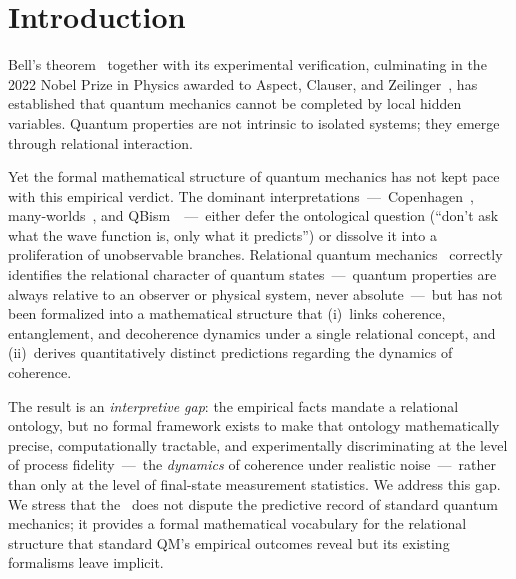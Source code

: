 
\section{Introduction}
\label{sec:intro}

Bell's theorem~\cite{Bell1964,CHSH1969} together with its experimental
verification, culminating in the 2022 Nobel Prize in Physics awarded to
Aspect, Clauser, and Zeilinger~\cite{Aspect1982,Zeilinger2022Nobel}, has
established that quantum mechanics cannot be completed by local hidden
variables.
Quantum properties are not intrinsic to isolated systems; they emerge through
relational interaction.

Yet the formal mathematical structure of quantum mechanics has not kept pace
with this empirical verdict.
The dominant interpretations~---~Copenhagen~\cite{Bohr1949},
many-worlds~\cite{Wallace2012}, and QBism~\cite{FMS2014}~---~either
defer the ontological question (``don't ask what the wave function is, only what
it predicts'') or dissolve it into a proliferation of unobservable branches.
Relational quantum mechanics~\cite{Rovelli1996,Rovelli2021} correctly identifies
the relational character of quantum states~---~quantum properties are always
relative to an observer or physical system, never absolute~---~but has not been
formalized into a mathematical structure that (i)~links coherence, entanglement,
and decoherence dynamics under a single relational concept, and (ii)~derives
quantitatively distinct predictions regarding the dynamics of coherence.

The result is an \emph{interpretive gap}: the empirical facts mandate a
relational ontology, but no formal framework exists to make that ontology
mathematically precise, computationally tractable, and experimentally
discriminating at the level of process fidelity~---~the \emph{dynamics} of
coherence under realistic noise~---~rather than only at the level of
final-state measurement statistics.
We address this gap.
We stress that the \RCT~does not dispute the predictive record of standard
quantum mechanics; it provides a formal mathematical vocabulary for the
relational structure that standard QM's empirical outcomes reveal but its
existing formalisms leave implicit.

